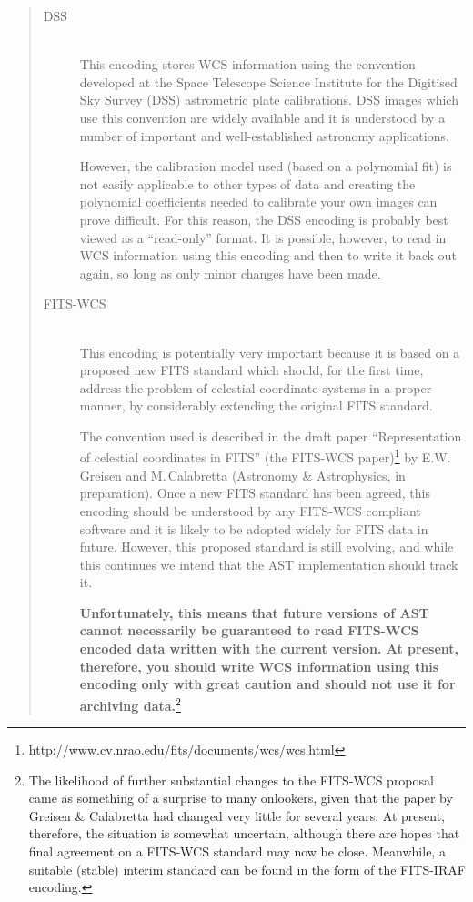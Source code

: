 \documentclass[twoside,11pt]{article}
\newcommand{\htmladdnormallinkfoot}[2]{#1\footnote{#2}}
\begin{document}
\begin{quote}
\begin{description}
\item[DSS]\mbox{}\\
This encoding stores WCS information using the convention developed at
the Space Telescope Science Institute for the Digitised Sky Survey
(DSS) astrometric plate calibrations.  DSS images which use this
convention are widely available and it is understood by a number of
important and well-established astronomy applications.

However, the calibration model used (based on a polynomial fit) is not
easily applicable to other types of data and creating the polynomial
coefficients needed to calibrate your own images can prove
difficult. For this reason, the DSS encoding is probably best viewed
as a ``read-only'' format. It is possible, however, to read in WCS
information using this encoding and then to write it back out again,
so long as only minor changes have been made.

\item[FITS-WCS]\mbox{}\\
This encoding is potentially very important because it is based on a
proposed new FITS standard which should, for the first time, address
the problem of celestial coordinate systems in a proper manner, by
considerably extending the original FITS standard.

The convention used is described in the draft paper ``Representation
of celestial coordinates in FITS'' \htmladdnormallinkfoot{(the
FITS-WCS paper)}{http://www.cv.nrao.edu/fits/documents/wcs/wcs.html}
by E.W.\,Greisen and M.\,Calabretta (Astronomy \& Astrophysics, in
preparation). Once a new FITS standard has been agreed, this encoding
should be understood by any FITS-WCS compliant software and it is
likely to be adopted widely for FITS data in future.  However, this
proposed standard is still evolving, and while this continues we
intend that the AST implementation should track it.

{\bf{Unfortunately, this means that future versions of AST cannot
necessarily be guaranteed to read FITS-WCS encoded data written with
the current version.  At present, therefore, you should write WCS
information using this encoding only with great caution and should not
use it for archiving data.}}\footnote{The likelihood of further
substantial changes to the FITS-WCS proposal came as something of a
surprise to many onlookers, given that the paper by Greisen \&
Calabretta had changed very little for several years. At present,
therefore, the situation is somewhat uncertain, although there are
hopes that final agreement on a FITS-WCS standard may now be close.
Meanwhile, a suitable (stable) interim standard can be found in the
form of the FITS-IRAF encoding.}


\end{description}
\end{quote}
\end{document}
